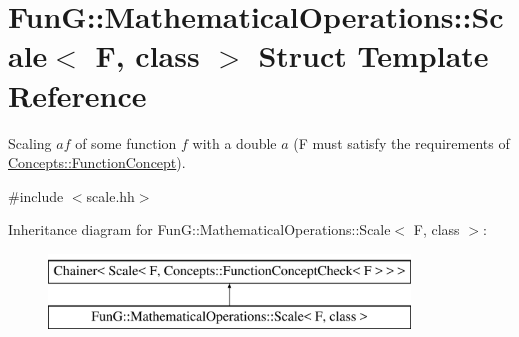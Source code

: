 \hypertarget{structFunG_1_1MathematicalOperations_1_1Scale}{}\section{FunG\+:\+:Mathematical\+Operations\+:\+:Scale$<$ F, class $>$ Struct Template Reference}
\label{structFunG_1_1MathematicalOperations_1_1Scale}


Scaling $ af $ of some function $ f $ with a double $ a $ (F must satisfy the requirements of \hyperlink{structFunG_1_1Concepts_1_1FunctionConcept}{Concepts\+::\+Function\+Concept}).  




{\ttfamily \#include $<$scale.\+hh$>$}

Inheritance diagram for FunG\+:\+:Mathematical\+Operations\+:\+:Scale$<$ F, class $>$\+:\begin{figure}[H]
\begin{center}
\leavevmode
\includegraphics[height=2.000000cm]{structFunG_1_1MathematicalOperations_1_1Scale}
\end{center}
\end{figure}
